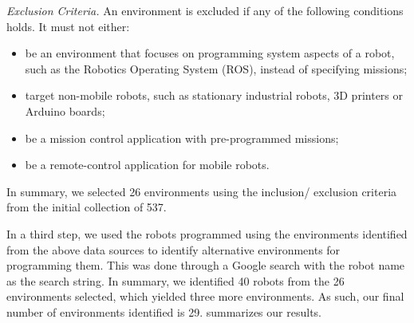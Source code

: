 \noindent
 \emph{Exclusion Criteria.} 
 An environment is excluded if any of the following conditions holds. It must not either:
\begin{itemize}
\item be an environment that focuses on programming system aspects of a robot, such as the Robotics Operating System (ROS), instead of specifying missions;
\item target non-mobile robots, such as stationary industrial robots, 3D printers or Arduino boards; 
\item be a mission control application with pre-programmed missions;
\item be a remote-control application for mobile robots.
\end{itemize}

In summary, we selected 26 environments using the inclusion/ exclusion criteria from the initial collection of 537.

 In a third step, we used the robots programmed using the environments identified from the above data sources to identify alternative environments for programming them. This was done through a Google search with the robot name as the search string.
In summary, we identified 40 robots from the 26 environments selected, which yielded three more environments. As such, our final number of environments identified is 29.  summarizes our results.



